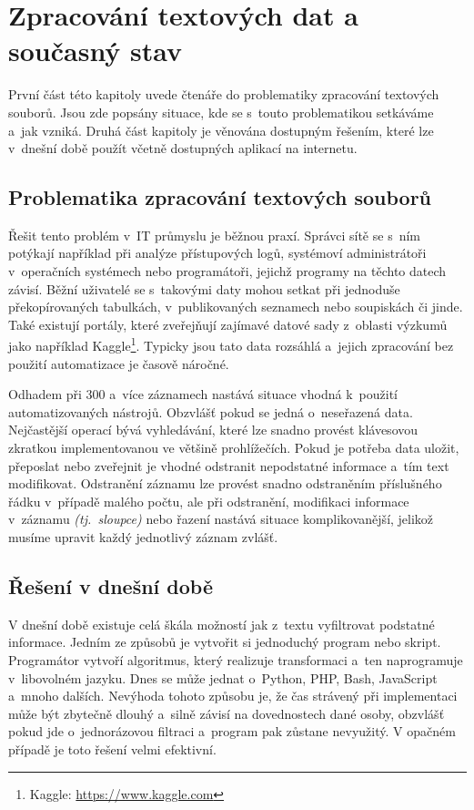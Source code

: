 \chapter{Zpracování textových dat a současný stav}
\label{chap:Zpracování textových dat a současný stav}
První část této kapitoly uvede čtenáře do problematiky zpracování textových souborů. Jsou zde popsány situace, kde se s~touto problematikou setkáváme a~jak vzniká. Druhá část kapitoly je věnována dostupným řešením, které lze v~dnešní době použít včetně dostupných aplikací na internetu.

\section{Problematika zpracování textových souborů}
Řešit tento problém v~IT průmyslu je běžnou praxí. Správci sítě se s~ním potýkají například při analýze přístupových logů, systémoví administrátoři v~operačních systémech nebo programátoři, jejichž programy na těchto datech závisí. Běžní uživatelé se s~takovými daty mohou setkat při jednoduše překopírovaných tabulkách, v~publikovaných seznamech nebo soupiskách či jinde. Také existují portály, které zveřejňují zajímavé datové sady z~oblasti výzkumů jako například Kaggle\footnote{Kaggle: \url{https://www.kaggle.com}}. Typicky jsou tato data rozsáhlá a~jejich zpracování bez použití automatizace je časově náročné. 

Odhadem při 300 a~více záznamech nastává situace vhodná k~použití automatizovaných nástrojů. Obzvlášť pokud se jedná o~neseřazená data. Nejčastější operací bývá vyhledávání, které lze snadno provést klávesovou zkratkou  implementovanou ve většině prohlížečích. Pokud je potřeba data uložit, přeposlat nebo zveřejnit je vhodné odstranit nepodstatné informace a~tím text modifikovat. Odstranění záznamu lze provést snadno odstraněním příslušného řádku v~případě malého počtu, ale při odstranění, modifikaci informace v~záznamu \textit{(tj.~sloupce)} nebo řazení nastává situace komplikovanější, jelikož musíme upravit každý jednotlivý záznam zvlášť.

\section{Řešení v dnešní době}
V dnešní době existuje celá škála možností jak z~textu vyfiltrovat podstatné informace. Jedním ze způsobů je vytvořit si jednoduchý program nebo skript. Programátor vytvoří algoritmus, který realizuje transformaci a~ten naprogramuje v~libovolném jazyku. Dnes se může jednat o~Python, PHP, Bash, JavaScript a~mnoho dalších. Nevýhoda tohoto způsobu je, že čas strávený při implementaci může být zbytečně dlouhý a~silně závisí na dovednostech dané osoby, obzvlášť pokud jde o~jednorázovou filtraci a~program pak zůstane nevyužitý. V opačném případě je toto řešení velmi efektivní.

